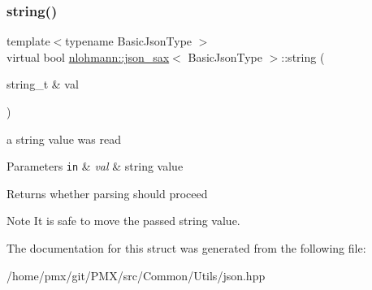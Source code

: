 \subsubsection{\texorpdfstring{string()}{string()}}
{\footnotesize\ttfamily template$<$typename Basic\+Json\+Type $>$ \\
virtual bool \hyperlink{structnlohmann_1_1json__sax}{nlohmann\+::json\+\_\+sax}$<$ Basic\+Json\+Type $>$\+::string (\begin{DoxyParamCaption}\item[{string\+\_\+t \&}]{val }\end{DoxyParamCaption})\hspace{0.3cm}{\ttfamily [pure virtual]}}



a string value was read 


\begin{DoxyParams}[1]{Parameters}
\mbox{\tt in}  & {\em val} & string value \\
\hline
\end{DoxyParams}
\begin{DoxyReturn}{Returns}
whether parsing should proceed 
\end{DoxyReturn}
\begin{DoxyNote}{Note}
It is safe to move the passed string value. 
\end{DoxyNote}


The documentation for this struct was generated from the following file\+:\begin{DoxyCompactItemize}
\item 
/home/pmx/git/\+P\+M\+X/src/\+Common/\+Utils/json.\+hpp\end{DoxyCompactItemize}
